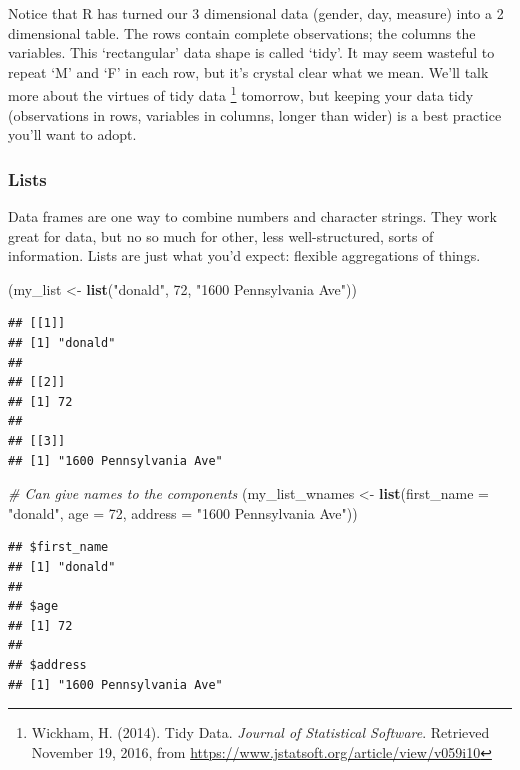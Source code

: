 \documentclass[]{article}
\newenvironment{Shaded}{\begin{snugshade}}{\end{snugshade}}
\newcommand{\KeywordTok}[1]{\textcolor[rgb]{0.13,0.29,0.53}{\textbf{#1}}}
\newcommand{\DataTypeTok}[1]{\textcolor[rgb]{0.13,0.29,0.53}{#1}}
\newcommand{\DecValTok}[1]{\textcolor[rgb]{0.00,0.00,0.81}{#1}}
\newcommand{\StringTok}[1]{\textcolor[rgb]{0.31,0.60,0.02}{#1}}
\newcommand{\CommentTok}[1]{\textcolor[rgb]{0.56,0.35,0.01}{\textit{#1}}}
\newcommand{\NormalTok}[1]{#1}
\let\rmarkdownfootnote\footnote%
\def\footnote{\protect\rmarkdownfootnote}
\begin{document}
Notice that R has turned our 3 dimensional data (gender, day, measure)
into a 2 dimensional table. The rows contain complete observations; the
columns the variables. This `rectangular' data shape is called `tidy'.
It may seem wasteful to repeat `M' and `F' in each row, but it's crystal
clear what we mean. We'll talk more about the virtues of tidy data
\footnote{Wickham, H. (2014). Tidy Data. \emph{Journal of Statistical
  Software}. Retrieved November 19, 2016, from
  \url{https://www.jstatsoft.org/article/view/v059i10}} tomorrow, but
keeping your data tidy (observations in rows, variables in columns,
longer than wider) is a best practice you'll want to adopt.

\subsubsection{Lists}\label{lists}

Data frames are one way to combine numbers and character strings. They
work great for data, but no so much for other, less well-structured,
sorts of information. Lists are just what you'd expect: flexible
aggregations of things.

\begin{Shaded}
\begin{Highlighting}[]
\NormalTok{(my_list <-}\StringTok{ }\KeywordTok{list}\NormalTok{(}\StringTok{"donald"}\NormalTok{, }\DecValTok{72}\NormalTok{, }\StringTok{"1600 Pennsylvania Ave"}\NormalTok{))}
\end{Highlighting}
\end{Shaded}

\begin{verbatim}
## [[1]]
## [1] "donald"
## 
## [[2]]
## [1] 72
## 
## [[3]]
## [1] "1600 Pennsylvania Ave"
\end{verbatim}

\begin{Shaded}
\begin{Highlighting}[]
\CommentTok{# Can give names to the components}
\NormalTok{(my_list_wnames <-}\StringTok{ }\KeywordTok{list}\NormalTok{(}\DataTypeTok{first_name =} \StringTok{"donald"}\NormalTok{, }\DataTypeTok{age =} \DecValTok{72}\NormalTok{, }\DataTypeTok{address =} \StringTok{"1600 Pennsylvania Ave"}\NormalTok{))}
\end{Highlighting}
\end{Shaded}

\begin{verbatim}
## $first_name
## [1] "donald"
## 
## $age
## [1] 72
## 
## $address
## [1] "1600 Pennsylvania Ave"
\end{verbatim}
\end{document}
